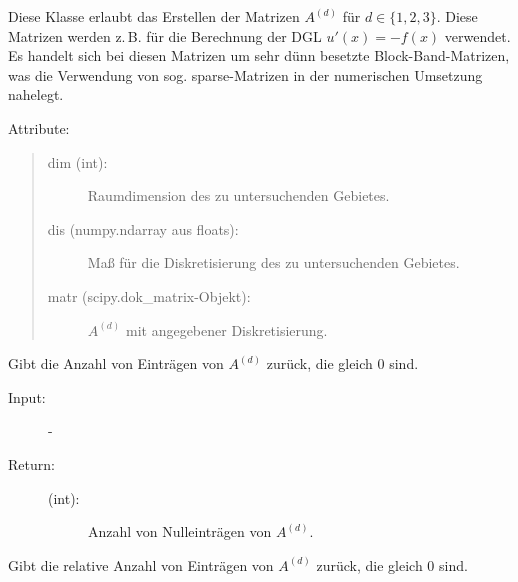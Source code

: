 \documentclass[a4paper,10pt,ngerman, oneside,openright]{sphinxmanual}
\begin{document}
\begin{fulllineitems}
\label{\detokenize{index:sparse.Sparse}}
Diese Klasse erlaubt das Erstellen der Matrizen $A^{(d)}$ für $d\in \{ 1,2,3 \}$. Diese Matrizen werden
z.\,B. für die Berechnung der DGL $u'(x)=-f(x)$ verwendet. Es handelt sich bei diesen Matrizen
um sehr dünn besetzte Block-Band-Matrizen, was die Verwendung von sog. sparse-Matrizen
in der numerischen Umsetzung nahelegt.

Attribute:
\begin{quote}
\begin{description}
\item[{dim (int):}] \leavevmode
Raumdimension des zu untersuchenden Gebietes.

\item[{dis (numpy.ndarray aus floats):}] \leavevmode
Maß für die Diskretisierung des zu untersuchenden Gebietes.

\item[{matr (scipy.dok\_matrix-Objekt):}] \leavevmode
$A^{(d)}$ mit angegebener Diskretisierung.

\end{description}
\end{quote}

\begin{fulllineitems}
\label{\detokenize{index:sparse.Sparse.anz_n_abs}}
Gibt die Anzahl von Einträgen von $A^{(d)}$ zurück, die gleich 0 sind.

\begin{description}
\item[{Input:}] -\leavevmode
\item[{Return:}] \leavevmode\begin{description}
\item[{(int):}] \leavevmode
Anzahl von Nulleinträgen von $A^{(d)}$.

\end{description}

\end{description}

\end{fulllineitems}


\begin{fulllineitems}
\label{\detokenize{index:sparse.Sparse.anz_n_rel}}
Gibt die relative Anzahl von Einträgen von $A^{(d)}$ zurück, die gleich 0 sind.


\end{fulllineitems}
\end{fulllineitems}
\end{document}
